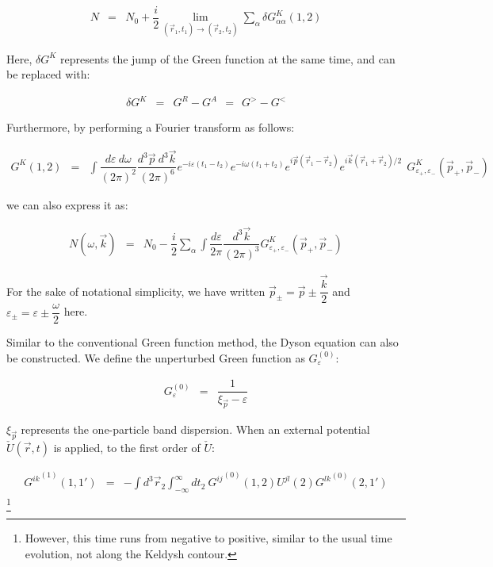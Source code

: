 \documentclass[uplatex,a4j,12pt,dvipdfmx]{jsarticle}
\begin{document}
\begin{eqnarray}
	N
	&=&
	N_{0} +
	\dfrac{i}{2}
	\lim_{(\vec{r}_{1} ,t_{1}) \to (\vec{r}_{2},t_{2})}
	\sum_{\alpha}
	\delta G^{K}_{\alpha \alpha}(1,2)
\end{eqnarray}

Here, $\delta G^{K}$ represents the jump of the Green function at the same time, and can be replaced with:

\begin{eqnarray}
	\delta G^{K}
	&=&
	G^{R} - G^{A}
	\ \ = \ \
	G^{>} - G^{<}
\end{eqnarray}

Furthermore, by performing a Fourier transform as follows:

\begin{eqnarray}
	G^{K} (1,2)
	&=&
	\int \!\! \dfrac{d \varepsilon \ d \omega}{(2 \pi)^{2}} \dfrac{d^{3} \vec{p} \ d^{3} \vec{k}}{(2 \pi)^{6}}
	e^{- i \varepsilon (t_{1} - t_{2})}
	e^{- i \omega (t_{1} + t_{2})}
	e^{i \vec{p} (\vec{r}_{1} - \vec{r}_{2})}
	e^{i \vec{k} (\vec{r}_{1} + \vec{r}_{2})/2}
	\ \
	G^{K}_{\varepsilon_{+},\varepsilon_{-}} (\vec{p}_{+},\vec{p}_{-})
\end{eqnarray}

we can also express it as:

\begin{eqnarray}
	N(\omega,\vec{k})
	&=&
	N_{0} -
	\dfrac{i}{2}
	\sum_{\alpha}
	\int \!\! \dfrac{d \varepsilon}{2 \pi} \dfrac{d^{3} \vec{k}}{(2 \pi)^{3}}
	G^{K}_{\varepsilon_{+},\varepsilon_{-}} (\vec{p}_{+},\vec{p}_{-})
\end{eqnarray}

For the sake of notational simplicity, we have written $\vec{p}_{\pm}=\vec{p} \pm \dfrac{\vec{k}}{2}$ and $\varepsilon_{\pm}=\varepsilon \pm \dfrac{\omega}{2}$ here.

Similar to the conventional Green function method, the Dyson equation can also be constructed.
We define the unperturbed Green function as $G^{(0)}_{\varepsilon}$:

\begin{eqnarray}
	G^{(0)}_{\varepsilon}
	&=&
	\dfrac{1}{\xi_{\vec{p}} - \varepsilon}
\end{eqnarray}

$\xi_{\vec{p}}$ represents the one-particle band dispersion.
When an external potential $\check{U}(\vec{r},t)$ is applied, to the first order of $\check{U}$:

\begin{eqnarray}
	{{G^{ik}}^{(1)}}(1,1')
	&=&
	- \int \!\! d^{3} \vec{r}_{2} \int^{\infty}_{-\infty} \!\!\! dt_{2} \
	{{G^{ij}}^{(0)}} (1,2) U^{jl}(2) {G^{lk}}^{(0)}(2,1')
\end{eqnarray}
\footnote{However, this time runs from negative to positive, similar to the usual time evolution, not along the Keldysh contour.}
\end{document}
